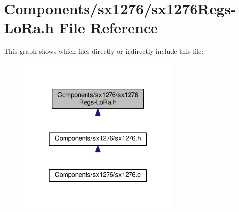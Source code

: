 \hypertarget{sx1276Regs-LoRa_8h}{}\section{Components/sx1276/sx1276\+Regs-\/\+Lo\+Ra.h File Reference}
\label{sx1276Regs-LoRa_8h}
This graph shows which files directly or indirectly include this file\+:
\nopagebreak
\begin{figure}[H]
\begin{center}
\leavevmode
\includegraphics[width=229pt]{sx1276Regs-LoRa_8h__dep__incl}
\end{center}
\end{figure}
